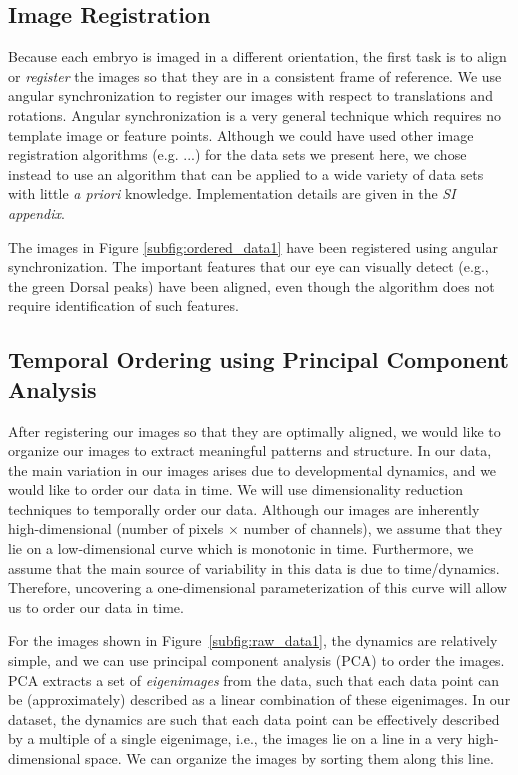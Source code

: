 \documentclass{pnastwo}
\begin{document}
\begin{article}
\subsection{Image Registration}

Because each embryo is imaged in a different orientation, the first task is to align or {\em register} the images so that they are in a consistent frame of reference.
%
We use angular synchronization \cite{singer2011angular} to register our images with respect to translations and rotations. 
%
Angular synchronization is a very general technique which requires no template image or feature points. 
%
Although we could have used other image registration algorithms (e.g. ...) for the data sets we present here, we chose instead to use an algorithm that can be applied to a wide variety of data sets with little {\em a priori} knowledge.
%
Implementation details are given in the {\it SI appendix}. 

The images in Figure \ref{subfig:ordered_data1} have been registered using angular synchronization.
%
The important features that our eye can visually detect (e.g., the green Dorsal peaks) have been aligned, even though the algorithm does not require identification of such features.

\subsection{Temporal Ordering using Principal Component Analysis}

After registering our images so that they are optimally aligned, we would like to organize our images to extract meaningful patterns and structure. 
%
In our data, the main variation in our images arises due to developmental dynamics, and we would like to order our data in time. 
%
We will use dimensionality reduction techniques to temporally order our data.
%
Although our images are inherently high-dimensional (number of pixels $\times$ number of channels), we assume that they lie on a low-dimensional curve which is monotonic in time. 
%
Furthermore, we assume that the main source of variability in this data is due to time/dynamics. 
%
Therefore, uncovering a one-dimensional parameterization of this curve will allow us to order our data in time. 

For the images shown in Figure~\ref{subfig:raw_data1}, the dynamics are relatively simple, and we can use principal component analysis (PCA) to order the images.
%
PCA extracts a set of {\it eigenimages} from the data, such that each data point can be (approximately) described as a linear combination of these eigenimages. 
%
In our dataset, the dynamics are such that each data point can be effectively described by a multiple of a single eigenimage, i.e., the images lie on a line in a very high-dimensional space.
%
We can organize the images by sorting them along this line.


\end{article}
\end{document}
